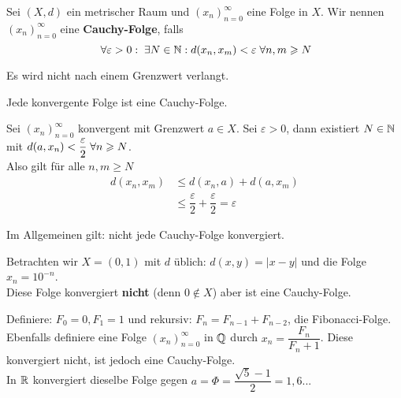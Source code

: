 \documentclass[main.tex]{subfiles}
\begin{document}
\begin{Definition}
  Sei $(X,d)$ ein metrischer Raum und $(x_n)_{n=0}^\infty$ eine Folge in $X$. Wir nennen $(x_n)_{n=0}^\infty$ eine \textbf{Cauchy-Folge}, falls
  $$\;\forall \varepsilon > 0 :  \;\exists N \in \mathbb{N} : d(x_n,x_m) < \varepsilon \;\forall n,m \geqslant N$$
  \begin{Bemerkung}
    Es wird nicht nach einem Grenzwert verlangt.
  \end{Bemerkung}
\end{Definition}

\begin{Theorem}
  Jede konvergente Folge ist eine Cauchy-Folge.
\end{Theorem}

\begin{Beweis}
  Sei $(x_n)_{n=0}^\infty$ konvergent mit Grenzwert $a \in X$. Sei $\varepsilon > 0$, dann existiert $N \in \mathbb{N}$ mit $d(a,x_n) < \dfrac{\varepsilon}{2} \;\forall n \geqslant N$.\\
  Also gilt für alle $n,m \geq N$
  $$\begin{aligned}
    d(x_n,x_m) &\leq d(x_n,a) + d(a,x_m)\\
    &\leq \dfrac{\varepsilon}{2} + \dfrac{\varepsilon}{2} = \varepsilon
  \end{aligned}$$
\end{Beweis}
\begin{Bemerkung}
  Im Allgemeinen gilt: nicht jede Cauchy-Folge konvergiert.
  \begin{Beispiel}
    Betrachten wir $X = (0,1)$ mit $d$ üblich: $d(x,y) = |x-y|$ und die Folge $x_n = 10^{-n}$.\\
    Diese Folge konvergiert \textbf{nicht} (denn $0 \notin X$) aber ist eine Cauchy-Folge.
  \end{Beispiel}
  \begin{Beispiel}
    Definiere: $F_0 = 0, F_1 = 1$ und rekursiv: $F_n = F_{n-1} + F_{n-2}$, die Fibonacci-Folge.\\
    Ebenfalls definiere eine Folge $(x_n)_{n=0}^\infty$ in $\mathbb{Q}$ durch $x_n = \dfrac{F_n}{F_n+1}$. Diese konvergiert nicht, ist jedoch eine Cauchy-Folge.\\
    In $\mathbb{R}$ konvergiert dieselbe Folge gegen $a = \Phi = \dfrac{\sqrt{5}-1}{2}=1,6...$
  \end{Beispiel}
\end{Bemerkung}
\end{document}
